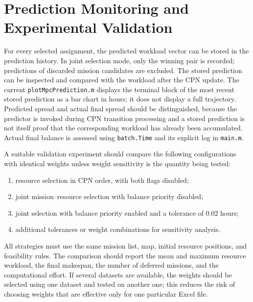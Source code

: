 \section{Prediction Monitoring and Experimental Validation}

For every selected assignment, the predicted workload vector can be stored
in the prediction history. In joint selection mode, only the winning pair
is recorded; predictions of discarded mission candidates are excluded.
The stored prediction can be inspected and compared with the workload after
the CPN update. The current \texttt{plotMpcPrediction.m} displays the terminal
block of the most recent stored prediction as a bar chart in hours; it does
not display a full trajectory. Predicted spread and actual final spread
should be distinguished, because the predictor is invoked during CPN
transition processing and a stored prediction is not itself proof that the
corresponding workload has already been accumulated. Actual final balance
is assessed using \texttt{batch.Time} and its explicit log in \texttt{main.m}.

A suitable validation experiment should compare the following configurations
with identical weights unless weight sensitivity is the quantity being tested:
\begin{enumerate}
	\item resource selection in CPN order, with both flags disabled;
	\item joint mission--resource selection with balance priority disabled;
	\item joint selection with balance priority enabled and a tolerance of
	$0.02$ hours;
	\item additional tolerances or weight combinations for sensitivity analysis.
\end{enumerate}

All strategies must use the same mission list, map, initial resource
positions, and feasibility rules. The comparison should report the mean and
maximum resource workload, the final makespan, the number of deferred
missions, and the computational effort. If several datasets are available,
the weights should be selected using one dataset and tested on another one;
this reduces the risk of choosing weights that are effective only for one
particular Excel file.

